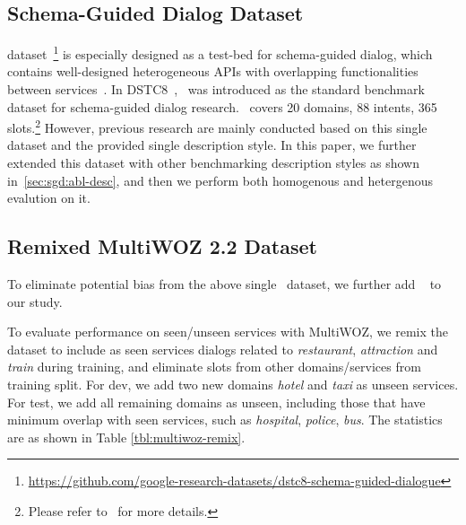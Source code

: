 \subsection{Schema-Guided Dialog Dataset}
\label{ssec:sgd:schema-dataset}
\sgdst
dataset~\footnote{\url{https://github.com/google-research-datasets/dstc8-schema-guided-dialogue}}
is especially designed as a test-bed for schema-guided dialog, which
contains well-designed heterogeneous APIs with overlapping
functionalities between services~\cite{rastogi2019towards}. In
DSTC8~\cite{rastogi2020schema}, \sgdst~was introduced as the standard
benchmark dataset for schema-guided dialog research. \sgdst~covers 20
domains, 88 intents, 365 slots.\footnote{Please refer to~\citet{rastogi2019towards} for more details.} However, previous research are mainly
conducted based on this single dataset and the provided single
description style. In this paper, we further extended this dataset
with other benchmarking description styles as shown in~\autoref{sec:sgd:abl-desc}, and then we perform both homogenous and
hetergenous evalution on it.

\subsection{Remixed MultiWOZ 2.2 Dataset}
\label{ssec:sgd:multiwoz-dataset}

To eliminate potential bias from the above single \sgdst~dataset, we
further add \multiwoz~\cite{zang-etal-2020-multiwoz} to our study.

To evaluate performance on seen/unseen services with MultiWOZ, we
remix the \multiwoz dataset to include as seen services dialogs
related to \textit{restaurant}, \textit{attraction} and \textit{train}
during training, and eliminate slots from other domains/services from
training split.  For dev, we add two new domains {\it hotel} and {\it
  taxi} as unseen services. For test, we add all remaining domains as
unseen, including those that have minimum overlap with seen services,
such as {\it hospital}, {\it police}, {\it bus}. The statistics are as
shown in Table \ref{tbl:multiwoz-remix}.

